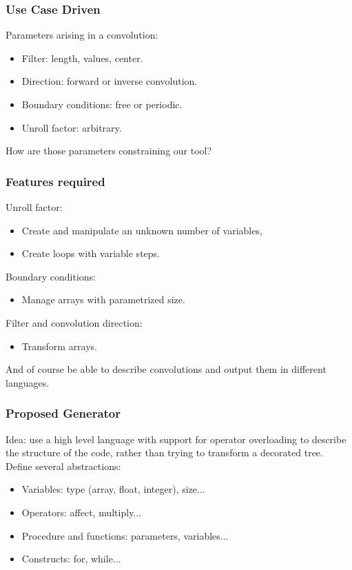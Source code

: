 \documentclass{beamer}
\begin{document}
\begin{frame}
\frametitle{Use Case Driven}
Parameters arising in a convolution:
\begin{itemize}
\item Filter: length, values, center.
\item Direction: forward or inverse convolution.
\item Boundary conditions: free or periodic.
\item Unroll factor: arbitrary.
\end{itemize}
How are those parameters constraining our tool?
\end{frame}

\begin{frame}
\frametitle{Features required}
Unroll factor:
\begin{itemize}
\item Create and manipulate an unknown number of variables,
\item Create loops with variable steps.
\end{itemize}
Boundary conditions:
\begin{itemize}
\item Manage arrays with parametrized size.
\end{itemize}
Filter and convolution direction:
\begin{itemize}
\item Transform arrays.
\end{itemize}
And of course be able to describe convolutions and output them in different languages.
\end{frame}

\begin{frame}
\frametitle{Proposed Generator}
Idea: use a high level language with support for operator overloading to describe the structure of the code, rather than trying to transform a decorated tree.\\
Define several abstractions:
\begin{itemize}
\item Variables: type (array, float, integer), size...
\item Operators: affect, multiply...
\item Procedure and functions: parameters, variables...
\item Constructs: for, while...
\end{itemize}
\end{frame}
\end{document}
